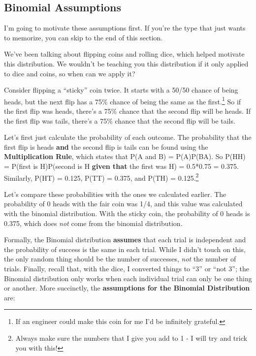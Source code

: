 \documentclass[
  letterpaper,
  DIV=11,
  numbers=noendperiod,
  oneside]{scrreprt}
\begin{document}
\hypertarget{binomial-assumptions}{%
\subsection{Binomial Assumptions}\label{binomial-assumptions}}

I'm going to motivate these assumptions first. If you're the type that
just wants to memorize, you can skip to the end of this section.

We've been talking about flipping coins and rolling dice, which helped
motivate this distribution. We wouldn't be teaching you this
distribution if it only applied to dice and coins, so when can we apply
it?

Consider flipping a ``sticky'' coin twice. It starts with a 50/50 chance
of being heads, but the next flip has a 75\% chance of being the same as
the first.\footnote{If an engineer could make this coin for me I'd be
  infinitely grateful.} So if the first flip was heads, there's a 75\%
chance that the second flip will be heads. If the first flip was tails,
there's a 75\% chance that the second flip will be tails.

Let's first just calculate the probability of each outcome. The
probability that the first flip is heads \textbf{and} the second flip is
tails can be found using the \textbf{Multiplication Rule}, which states
that P(A and B) = P(A)P(B\textbar A). So P(HH) = P(first is H)P(second
is H \textbf{given that} the first was H) = 0.5*0.75 = 0.375. Similarly,
P(HT) = 0.125, P(TT) = 0.375, and P(TH) = 0.125.\footnote{Always make
  sure the numbers that I give you add to 1 - I will try and trick you
  with this!}

Let's compare these probabilities with the ones we calculated earlier.
The probability of 0 heads with the fair coin was 1/4, and this value
was calculated with the binomial distribution. With the sticky coin, the
probability of 0 heads is 0.375, which does \emph{not} come from the
binomial distribution.

Formally, the Binomial distribution \textbf{assumes} that each trial is
independent and the probability of success is the same in each trial.
While I didn't touch on this, the only random thing should be the number
of successes, \emph{not} the number of trials. Finally, recall that,
with the dice, I converted things to ``3'' or ``not 3''; the Binomial
distribution only works when each individual trial can only be one thing
or another. More succinctly, the \textbf{assumptions for the Binomial
Distribution} are:
\end{document}
